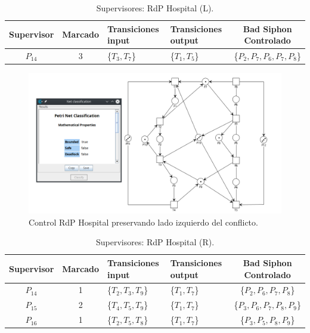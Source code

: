 \begin{table}[H]
    \centering
    \begin{tabular}{|c|c|P{2.2cm}|P{2.2cm}|c|}
    \hline
    \textbf{Supervisor} & \textbf{Marcado} & \textbf{Transiciones input} & \textbf{Transiciones output} & \textbf{Bad Siphon Controlado}  \\  \hline
    $P_{14}$ & 3 & \{$T_{3}, T_{7}$\} & \{$T_{1}, T_{5}$\} & \{$P_2, P_{7}, P_{6}, P_{7}, P_{8}$\} \\ 
    \hline
    \end{tabular}
    \caption{Supervisores: RdP Hospital (L).}
    \label{tab:Hospital-SubL}
\end{table}
\bigskip

\begin{figure}[H]
	\centering
		\includegraphics[width=\textwidth]{Figures/algoritmo3/Hospital5.png}
	\caption{Control RdP Hospital preservando lado izquierdo del conflicto.}
	\label{fig:ladoizquierdoconflictocontrol}
 \end{figure}
\bigskip

\begin{table}[H]
    \centering
    \begin{tabular}{|c|c|P{2.2cm}|P{2.2cm}|c|}
    \hline
    \textbf{Supervisor} & \textbf{Marcado} & \textbf{Transiciones input} & \textbf{Transiciones output} & \textbf{Bad Siphon Controlado}  \\  \hline
    $P_{14}$ & 1 & \{$T_{2}, T_{3}, T_9$\} & \{$T_{1}, T_{7}$\} & \{$P_2, P_{6}, P_{7}, P_{8}$\} \\ 
    \hline
    $P_{15}$ & 2 & \{$T_{4}, T_{5}, T_9$\} & \{$T_{1}, T_{7}$\} & \{$P_{3},P_{6},P_{7},P_{8}, P_{9}$\} \\ 
    \hline
    $P_{16}$ & 1 & \{$T_{2}, T_{5}, T_8$\} & \{$T_{1}, T_{7}$\} & \{$P_{3},P_{5},P_{8},P_{9}$\} \\ 
    \hline
    \end{tabular}
    \caption{Supervisores: RdP Hospital (R).}
    \label{tab:Hospital-SubR}
\end{table}


